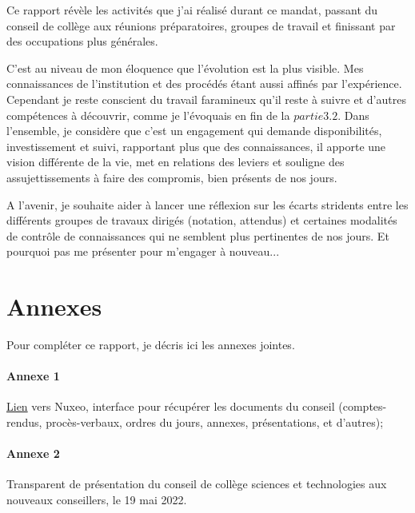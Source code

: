 \documentclass{article}
\begin{document}
Ce rapport révèle les activités que j'ai réalisé durant ce mandat, passant du conseil de collège aux réunions préparatoires, groupes de travail et finissant par des occupations plus générales.

C'est au niveau de mon éloquence que l'évolution est la plus visible. Mes connaissances de l'institution et des procédés étant aussi affinés par l'expérience. Cependant je reste conscient du travail faramineux qu'il reste à suivre et d'autres compétences à découvrir, comme je l'évoquais en fin de la $partie 3.2$. Dans l'ensemble, je considère que c'est un engagement qui demande disponibilités, investissement et suivi, rapportant plus que des connaissances, il apporte une vision différente de la vie, met en relations des leviers et souligne des assujettissements à faire des compromis, bien présents de nos jours.

A l'avenir, je souhaite aider à lancer une réflexion sur les écarts stridents entre les différents groupes de travaux dirigés (notation, attendus) et certaines modalités de contrôle de connaissances qui ne semblent plus pertinentes de nos jours. Et pourquoi pas me présenter pour m'engager à nouveau...
\newpage
\section{Annexes}
Pour compléter ce rapport, je décris ici les annexes jointes.

\paragraph{Annexe 1} \href{https://nuxeo.u-bordeaux.fr/nuxeo/nxpath/default/default-domain/workspaces/Colleges/Coll\%C3\%A8ge\%20ST.1623307472368/Espace\%20commun\%20coll\%C3\%A8ge\%20ST/Conseil\%20Coll\%C3\%A8ge/2022@view_documents?tabIds=MAIN_TABS\%3Adocuments\%2C\%3A&conversationId=0NXMAIN1}{Lien} vers Nuxeo, interface pour récupérer les documents du conseil (comptes-rendus, procès-verbaux, ordres du jours, annexes, présentations, et d'autres);

\paragraph{Annexe 2} Transparent de présentation du conseil de collège sciences et technologies aux nouveaux conseillers, le 19 mai 2022.
\end{document}
